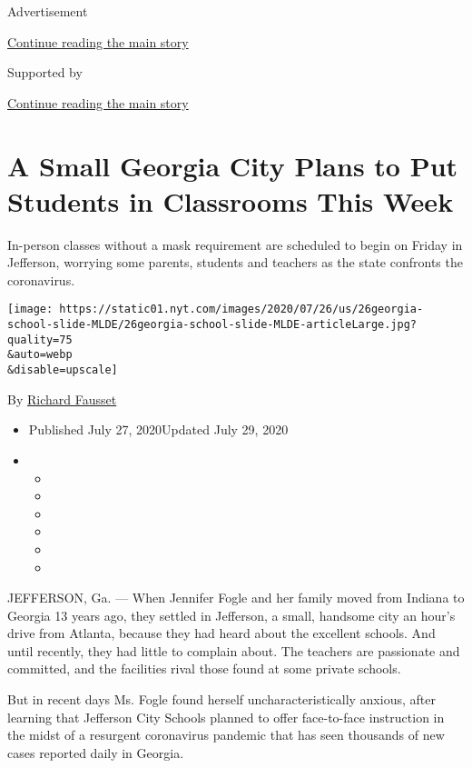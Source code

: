 Advertisement

\protect\hyperlink{after-top}{Continue reading the main story}

Supported by

\protect\hyperlink{after-sponsor}{Continue reading the main story}

\hypertarget{a-small-georgia-city-plans-to-put-students-in-classrooms-this-week}{%
\section{A Small Georgia City Plans to Put Students in Classrooms This
Week}\label{a-small-georgia-city-plans-to-put-students-in-classrooms-this-week}}

In-person classes without a mask requirement are scheduled to begin on
Friday in Jefferson, worrying some parents, students and teachers as the
state confronts the coronavirus.

\texttt{[image: https://static01.nyt.com/images/2020/07/26/us/26georgia-school-slide-MLDE/26georgia-school-slide-MLDE-articleLarge.jpg?quality=75\\\&auto=webp\\\&disable=upscale]}

By \href{https://www.nytimes.com/by/richard-fausset}{Richard Fausset}

\begin{itemize}
\item
  Published July 27, 2020Updated July 29, 2020
\item
  \begin{itemize}
  \item
  \item
  \item
  \item
  \item
  \item
  \end{itemize}
\end{itemize}

JEFFERSON, Ga. --- When Jennifer Fogle and her family moved from Indiana
to Georgia 13 years ago, they settled in Jefferson, a small, handsome
city an hour's drive from Atlanta, because they had heard about the
excellent schools. And until recently, they had little to complain
about. The teachers are passionate and committed, and the facilities
rival those found at some private schools.

But in recent days Ms. Fogle found herself uncharacteristically anxious,
after learning that Jefferson City Schools planned to offer face-to-face
instruction in the midst of a resurgent coronavirus pandemic that has
seen thousands of new cases reported daily in Georgia.

